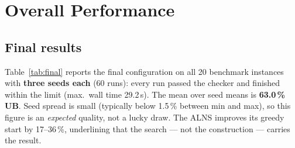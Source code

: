 \documentclass[10pt, a4paper]{article}
\newcommand{\ub}{\%\,UB}
\begin{document}
\section{Overall Performance}\label{sec:overall}

\subsection{Final results}
Table~\ref{tab:final} reports the final configuration on all 20 benchmark
instances with \textbf{three seeds each} (60 runs): every run passed the
checker and finished within the limit (max.\ wall time 29.2\,s). The mean
over seed means is \textbf{63.0\,\ub}. Seed spread is small (typically below
1.5\,\% between min and max), so this figure is an \emph{expected} quality,
not a lucky draw. The ALNS improves its greedy start by 17--36\,\%,
underlining that the search --- not the construction --- carries the result.
\end{document}
